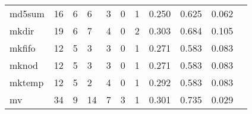 \begin{longtable}{lp{1.2cm}p{1.2cm}p{1.2cm}p{1.2cm}p{1.2cm}p{1.2cm}p{1.2cm}p{1.2cm}p{1.2cm}p{1.2cm}}
md5sum    &                                    16 &                                                  6 &                                                  6 &                                                  3 &                                                  0 &                                                  1 &                                         0.250 &                                              0.625 &                                              0.062 \\
mkdir     &                                    19 &                                                  6 &                                                  7 &                                                  4 &                                                  0 &                                                  2 &                                         0.303 &                                              0.684 &                                              0.105 \\
mkfifo    &                                    12 &                                                  5 &                                                  3 &                                                  3 &                                                  0 &                                                  1 &                                         0.271 &                                              0.583 &                                              0.083 \\
mknod     &                                    12 &                                                  5 &                                                  3 &                                                  3 &                                                  0 &                                                  1 &                                         0.271 &                                              0.583 &                                              0.083 \\
mktemp    &                                    12 &                                                  5 &                                                  2 &                                                  4 &                                                  0 &                                                  1 &                                         0.292 &                                              0.583 &                                              0.083 \\
mv        &                                    34 &                                                  9 &                                                 14 &                                                  7 &                                                  3 &                                                  1 &                                         0.301 &                                              0.735 &                                              0.029 \\

\end{longtable}
